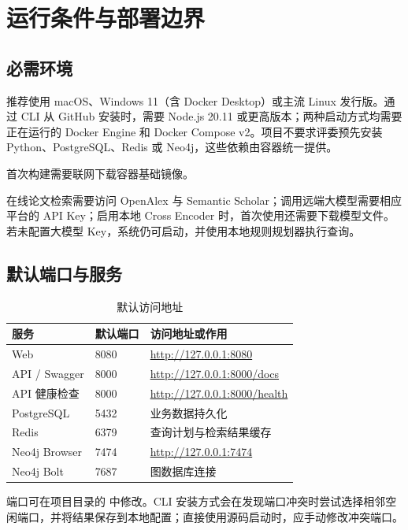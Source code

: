 \documentclass[a4paper,11pt,fontset=none]{ctexart}
\newcommand{\codeinline}[1]{\texttt{\detokenize{#1}}}
\begin{document}
\section{运行条件与部署边界}

\subsection{必需环境}

推荐使用 macOS、Windows 11（含 Docker Desktop）或主流 Linux 发行版。通过 CLI 从 GitHub 安装时，需要 Node.js 20.11 或更高版本；两种启动方式均需要正在运行的 Docker Engine 和 Docker Compose v2。项目不要求评委预先安装 Python、PostgreSQL、Redis 或 Neo4j，这些依赖由容器统一提供。

首次构建需要联网下载容器基础镜像。

在线论文检索需要访问 OpenAlex 与 Semantic Scholar；调用远端大模型需要相应平台的 API Key；启用本地 Cross Encoder 时，首次使用还需要下载模型文件。若未配置大模型 Key，系统仍可启动，并使用本地规则规划器执行查询。

\subsection{默认端口与服务}

\begin{table}[htbp]
\centering
\caption{默认访问地址}
\begin{tabularx}{\textwidth}{C{3.2cm} C{2.4cm} Y}
\toprule
\textbf{服务} & \textbf{默认端口} & \textbf{访问地址或作用} \\
\midrule
Web & 8080 & \url{http://127.0.0.1:8080} \\
API / Swagger & 8000 & \url{http://127.0.0.1:8000/docs} \\
API 健康检查 & 8000 & \url{http://127.0.0.1:8000/health} \\
PostgreSQL & 5432 & 业务数据持久化 \\
Redis & 6379 & 查询计划与检索结果缓存 \\
Neo4j Browser & 7474 & \url{http://127.0.0.1:7474} \\
Neo4j Bolt & 7687 & 图数据库连接 \\
\bottomrule
\end{tabularx}
\end{table}

端口可在项目目录的 \codeinline{.env} 中修改。CLI 安装方式会在发现端口冲突时尝试选择相邻空闲端口，并将结果保存到本地配置；直接使用源码启动时，应手动修改冲突端口。
\end{document}

